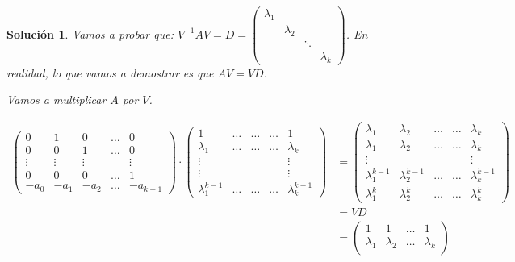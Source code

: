 \documentclass[11pt, a4paper]{article}
\newif\IfInSansMode
\numberwithin{equation}{section}
\theoremstyle{theorem-style}
\theoremstyle{definition-style}
\theoremstyle{remark-style}
\newtheorem*{sol}{Solución}
\theoremstyle{example-style}
\begin{document}
\begin{sol}
    Vamos a probar que: $V^{-1}AV = D = \begin{pmatrix}
        \lambda_1 & & & \\
                  & \lambda_2 & & \\
                  & & \ddots & \\
                  & & & \lambda_k
    \end{pmatrix}$. En realidad, lo que vamos a demostrar es que $AV = VD$.

    Vamos a multiplicar $A$ por $V$.

    \begin{align*}
        \label{}
        \begin{pmatrix}
            0 & 1 & 0 & \hdots & 0 \\
            0 & 0 & 1 & \hdots & 0 \\
            \vdots & \vdots & \vdots & & \vdots \\
            0 & 0 & 0 & \hdots & 1 \\
            -a_0 & -a_1 & -a_2 & \hdots & -a_{k-1}
        \end{pmatrix} \cdot \begin{pmatrix}
            1 & \hdots & \hdots & \hdots & 1 \\
            \lambda_1 & \hdots & \hdots & \hdots & \lambda_k \\
            \vdots & & & & \vdots \\
            \vdots & & & & \vdots \\
            \lambda_1^{k-1} & \hdots & \hdots & \hdots & \lambda_k^{k-1}
        \end{pmatrix} &= \begin{pmatrix}
            \lambda_1 & \lambda_2 & \hdots & \hdots & \lambda_k \\
            \lambda_1 & \lambda_2 & \hdots & \hdots & \lambda_k \\
            \vdots & & & & \vdots \\
            \lambda_1^{k-1} & \lambda_2^{k-1} & \hdots & \hdots & \lambda_k^{k-1} \\
            \lambda_1^k & \lambda_2^k & \hdots & \hdots & \lambda_k^k
        \end{pmatrix}\\
        &= VD \\
        &= \begin{pmatrix}
        1 & 1 & \hdots & 1 \\
        \lambda_1 & \lambda_2 & \hdots & \lambda_k \\

\end{pmatrix}
\end{align*}
\end{sol}
\end{document}
